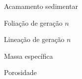\begin{simbolos}
  \item[$S_0$] Acamamento sedimentar
  \item[$S_n$] Foliação de geração $n$
  \item[$L_n$] Lineação de geração $n$
  \item[$\rho$] Massa específica
  \item[$\phi$] Porosidade
\end{simbolos}
\cleardoublepage

